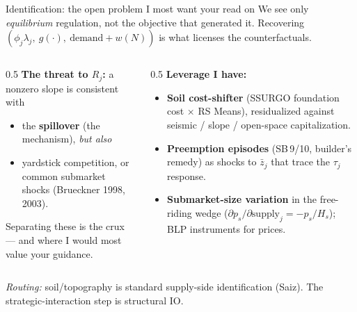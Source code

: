 \documentclass[10pt,aspectratio=169]{beamer}
\begin{document}
\begin{frame}{Identification: the open problem I most want your read on}
We see only \emph{equilibrium} regulation, not the objective that generated it. Recovering
$(\phi_j\lambda_j,\ g(\cdot),\ \text{demand}+w(N))$ is what licenses the counterfactuals.
\medskip
\begin{columns}[T]
\begin{column}{0.5\textwidth}
\textbf{The threat to $R_j$:} a nonzero slope is consistent with
\begin{itemize}\small
  \item the \textbf{spillover} (the mechanism), \emph{but also}
  \item yardstick competition, or common submarket shocks (Brueckner 1998, 2003).
\end{itemize}
Separating these is the crux --- and where I would most value your guidance.
\end{column}
\begin{column}{0.5\textwidth}
\textbf{Leverage I have:}
\begin{itemize}\small
  \item \textbf{Soil cost-shifter} (SSURGO foundation cost $\times$ RS Means), residualized
  against seismic / slope / open-space capitalization.
  \item \textbf{Preemption episodes} (SB\,9/10, builder's remedy) as shocks to $\bar z_j$ that
  trace the $\tau_j$ response.
  \item \textbf{Submarket-size variation} in the free-riding wedge
  ($\partial p_s/\partial \text{supply}_j=-p_s/H_s$); BLP instruments for prices.
\end{itemize}
\end{column}
\end{columns}
\vspace{0.3em}
{\footnotesize\emph{Routing:} soil/topography is standard supply-side identification (Saiz). The
strategic-interaction step is structural IO.}
\end{frame}
\end{document}
